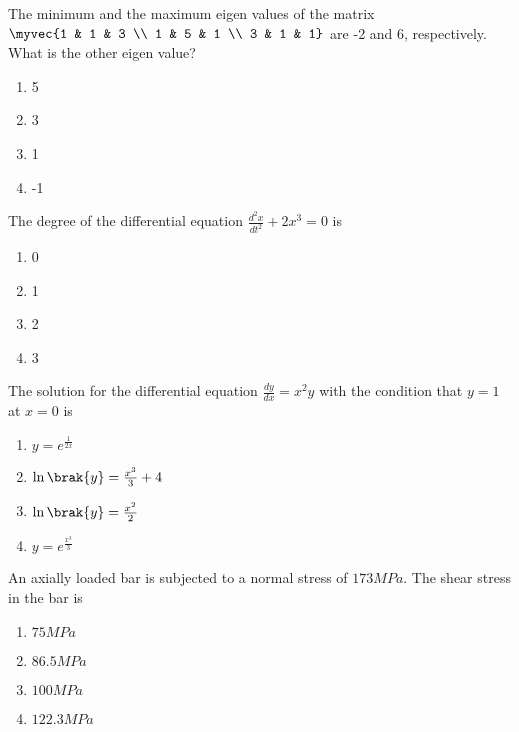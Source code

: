 \iffalse	
	\chapter{2007}
	\author{AI24BTECH11016}
	\section{ce}
\fi

\item
	The minimum and the maximum eigen values of the matrix $\myvec{1 & 1 & 3 \\ 1 & 5 & 1 \\ 3 & 1 & 1}$ are -2 and 6, respectively. What is the other eigen value?
		\begin{enumerate}
			\item 5
			\item 3
			\item 1
			\item -1
		\end{enumerate}
	\item
	The degree of the differential equation $\frac{d^{2}x}{d{t}^2} + 2x^3 = 0$ is
		\begin{enumerate}
			\item 0
			\item 1
			\item 2
			\item 3
		\end{enumerate}
	\item
	The solution for the differential equation $\frac{dy}{dx} = x^{2}y$ with the condition that $y=1$ at $x=0$ is 
		\begin{enumerate}
			\item $y=e^{\frac{1}{2x}}$
			\item $\ln\brak{y} = \frac{x^3}{3} + 4$
			\item $\ln\brak{y} = \frac{x^2}{2}$
			\item $y = e^{\frac{x^3}{3}}$
		\end{enumerate}
	\item
	An axially loaded bar is subjected to a normal stress of $173 MPa$. The shear stress in the bar is
		\begin{enumerate}
			\item $75 MPa$
			\item $86.5 MPa$
			\item $100 MPa$
			\item $122.3 MPa$
		\end{enumerate}
	\item
